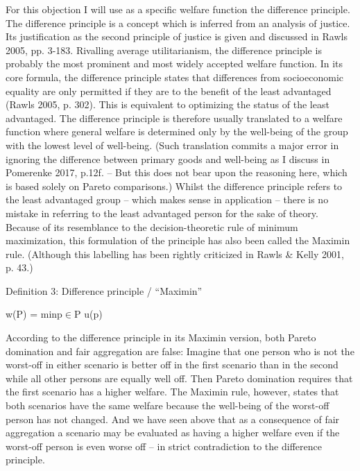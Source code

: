  For this objection I will use as a specific welfare function the difference principle. The difference principle is a concept which is inferred from an analysis of justice. Its justification as the second principle of justice is given and discussed in \label{ref:RNDaX1kFAqXc5}Rawls 2005, pp. 3-183. Rivalling average utilitarianism, the difference principle is probably the most prominent and most widely accepted welfare function. In its core formula, the difference principle states that differences from socioeconomic equality are only permitted if they are to the benefit of the least advantaged (\label{ref:RND4PXINhR0Cj}Rawls 2005, p. 302). This is equivalent to optimizing the status of the least advantaged. The difference principle is therefore usually translated to a welfare function where general welfare is determined only by the well-being of the group with the lowest level of well-being. (Such translation commits a major error in ignoring the difference between primary goods and well-being as I discuss in \label{ref:RNDxfDrFqEWzs}Pomerenke 2017, p.12f. – But this does not bear upon the reasoning here, which is based solely on Pareto comparisons.) Whilst the difference principle refers to the least advantaged group – which makes sense in application – there is no mistake in referring to the least advantaged person for the sake of theory. Because of its resemblance to the decision-theoretic rule of minimum maximization, this formulation of the principle has also been called the Maximin rule. (Although this labelling has been rightly criticized in \label{ref:RND4jKuJkTAlW}Rawls \& Kelly 2001, p. 43.) 

 Definition 3: Difference principle / “Maximin” 

 w(P) = minp${\in}$P u(p) 

 According to the difference principle in its Maximin version, both Pareto domination and fair aggregation are false: Imagine that one person who is not the worst-off in either scenario is better off in the first scenario than in the second while all other persons are equally well off. Then Pareto domination requires that the first scenario has a higher welfare. The Maximin rule, however, states that both scenarios have the same welfare because the well-being of the worst-off person has not changed. And we have seen above that as a consequence of fair aggregation a scenario may be evaluated as having a higher welfare even if the worst-off person is even worse off – in strict contradiction to the difference principle.  

